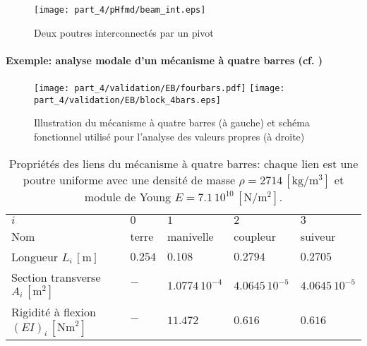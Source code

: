 \begin{figure}[t]
	\centering
	\texttt{[image: part\_4/pHfmd/beam\_int.eps]} 
	\caption{Deux poutres interconnectés par un pivot}
	\label{fig:beam_int_fr}
\end{figure}

\paragraph{Exemple: analyse modale d'un mécanisme à quatre barres (cf. )}

\begin{figure}[tb]
	\centering
	\texttt{[image: part\_4/validation/EB/fourbars.pdf]} 
	\hspace{.3cm}
	\texttt{[image: part\_4/validation/EB/block\_4bars.eps]} 
	\caption{Illustration du mécanisme à quatre barres (à gauche) et schéma fonctionnel utilisé pour l'analyse des valeurs propres (à droite)}
	\label{fig:4bars_fr}
\end{figure}

\begin{table}[bt]
	\centering
	\caption{Propriétés des liens du mécanisme à quatre barres: chaque lien est une poutre uniforme avec une densité de masse $\rho=2714\,[\mathrm{kg}/\mathrm{m}^3]$ et module de Young $E=7.1\,10^{10}\,[\mathrm{N}/\mathrm{m}^2]$. }
	\label{tab:data_4bars_fr}       %
	\begin{tabular}{lllll}
		\hline\noalign{\smallskip}
		$i$ & $0$ &  $1$ &  $2$ &  $3$  \\
		\noalign{\smallskip}\hline\noalign{\smallskip}
		Nom & terre & manivelle & coupleur & suiveur \\ 
		Longueur $L_i\,[\mathrm{m}]$ & $0.254$ & $0.108$ & $0.2794$ & $0.2705$\\
		Section transverse $A_i\,[\mathrm{m}^2]$ & $-$ & $1.0774\,10^{-4}$ & $4.0645\,10^{-5}$ & $4.0645\,10^{-5}$ \\
		Rigidité à flexion $(EI)_i\,[\mathrm{Nm}^2]$ & $-$ & $11.472$ & $0.616$ & $0.616$ \\
		\hline
	\end{tabular}
\end{table}

